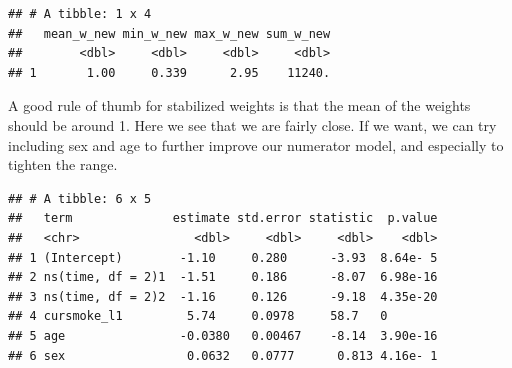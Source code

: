 \documentclass[
]{book}
\newenvironment{Shaded}{\begin{snugshade}}{\end{snugshade}}
\newcommand{\DataTypeTok}[1]{\textcolor[rgb]{0.13,0.29,0.53}{#1}}
\newcommand{\DecValTok}[1]{\textcolor[rgb]{0.00,0.00,0.81}{#1}}
\newcommand{\KeywordTok}[1]{\textcolor[rgb]{0.13,0.29,0.53}{\textbf{#1}}}
\newcommand{\NormalTok}[1]{#1}
\newcommand{\OperatorTok}[1]{\textcolor[rgb]{0.81,0.36,0.00}{\textbf{#1}}}
\newcommand{\StringTok}[1]{\textcolor[rgb]{0.31,0.60,0.02}{#1}}
\begin{document}
\begin{verbatim}
## # A tibble: 1 x 4
##   mean_w_new min_w_new max_w_new sum_w_new
##        <dbl>     <dbl>     <dbl>     <dbl>
## 1       1.00     0.339      2.95    11240.
\end{verbatim}

A good rule of thumb for stabilized weights is that the mean of the weights should be around 1. Here we see that we are fairly close. If we want, we can try including sex and age to further improve our numerator model, and especially to tighten the range.

\begin{Shaded}
\end{Shaded}

\begin{verbatim}
## # A tibble: 6 x 5
##   term              estimate std.error statistic  p.value
##   <chr>                <dbl>     <dbl>     <dbl>    <dbl>
## 1 (Intercept)        -1.10     0.280      -3.93  8.64e- 5
## 2 ns(time, df = 2)1  -1.51     0.186      -8.07  6.98e-16
## 3 ns(time, df = 2)2  -1.16     0.126      -9.18  4.35e-20
## 4 cursmoke_l1         5.74     0.0978     58.7   0       
## 5 age                -0.0380   0.00467    -8.14  3.90e-16
## 6 sex                 0.0632   0.0777      0.813 4.16e- 1
\end{verbatim}
\end{document}
